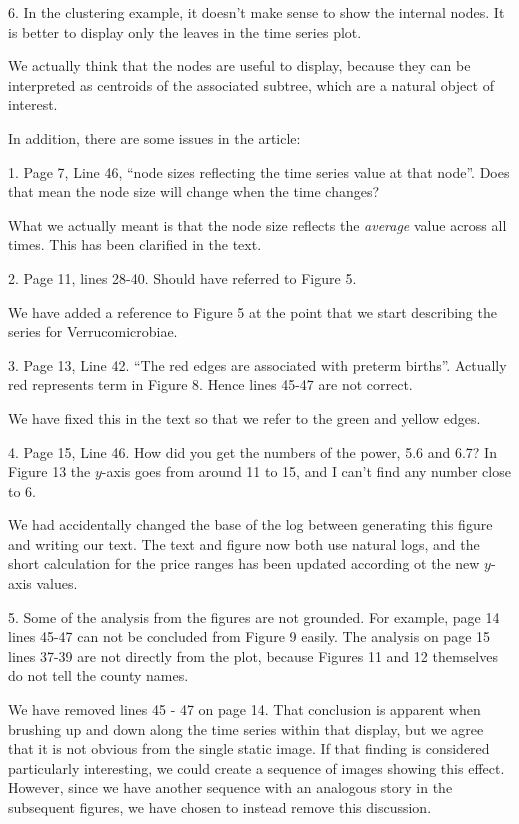 \documentclass{article}
\begin{document}
\color{blue}

6. In the clustering example, it doesn't make sense to show the internal nodes.
It is better to display only the leaves in the time series plot.

\color{black}
We actually think that the nodes are useful to display, because they can be
interpreted as centroids of the associated subtree, which are a natural object
of interest.

\color{blue}

In addition, there are some issues in the article:

\color{blue}

1. Page 7, Line 46, ``node sizes reflecting the time series value at that
node''. Does that mean the node size will change when the time changes?

\color{black}
What we actually meant is that the node size reflects the \textit{average} value
across all times. This has been clarified in the text.

\color{blue} 2. Page 11, lines 28-40. Should have referred to Figure 5.

\color{black}
We have added a reference to Figure 5 at the point that we start describing the
series for Verrucomicrobiae.

\color{blue} 3. Page 13, Line 42. ``The red edges are associated with preterm
  births''. Actually red represents term in Figure 8. Hence lines 45-47 are not
  correct.

\color{black}
We have fixed this in the text so that we refer to the green and yellow edges.

\color{blue}

4. Page 15, Line 46. How did you get the numbers of the power, 5.6 and 6.7? In
Figure 13 the $y$-axis goes from around 11 to 15, and I can't find any number
close to 6.

\color{black}
We had accidentally changed the base of the log between generating this figure
and writing our text. The text and figure now both use natural logs, and the
short calculation for the price ranges has been updated according ot the new
$y$-axis values.

\color{blue}
5. Some of the analysis from the figures are not grounded. For example, page 14
lines 45-47 can not be concluded from Figure 9 easily. The analysis on page 15
lines 37-39 are not directly from the plot, because Figures 11 and 12 themselves
do not tell the county names.

\color{black}
We have removed lines 45 - 47 on page 14. That conclusion is apparent when
brushing up and down along the time series within that display, but we agree
that it is not obvious from the single static image. If that finding is
considered particularly interesting, we could create a sequence of images
showing this effect. However, since we have another sequence with an analogous
story in the subsequent figures, we have chosen to instead remove this
discussion.
\end{document}
